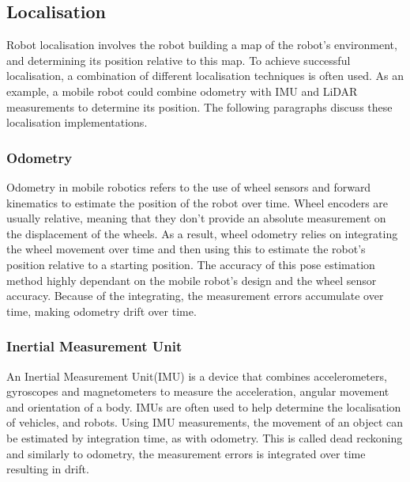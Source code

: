 

\subsection{Localisation}\label{sec:T:AN:Localisation}
Robot localisation involves the robot building a map of the robot's environment, and determining its position relative to this map\cite{SiegwartRoland2011Itam}.  To achieve successful localisation, a combination of different localisation techniques is often used. As an example, a mobile robot could combine odometry with IMU and LiDAR measurements to determine its position. The following paragraphs discuss these localisation implementations.


\subsubsection{Odometry}
Odometry in mobile robotics refers to the use of wheel sensors and forward kinematics to estimate the position of the robot over time. Wheel encoders are usually relative, meaning that they don't provide an absolute measurement on the displacement of the wheels. As a result, wheel odometry relies on integrating the wheel movement over time and then using this to estimate the robot's position relative to a starting position. The accuracy of this pose estimation method highly dependant on the mobile robot's design and the wheel sensor accuracy. Because of the integrating, the measurement errors accumulate over time, making odometry drift over time.

\subsubsection{Inertial Measurement Unit}
An Inertial Measurement Unit(IMU) is a device that combines accelerometers, gyroscopes and magnetometers to measure the acceleration, angular movement and orientation of a body. IMUs are often used to help determine the localisation of vehicles, and robots. Using IMU measurements, the movement of an object can be estimated by integration time, as with odometry. This is called dead reckoning and similarly to odometry, the measurement errors is integrated over time resulting in drift.


